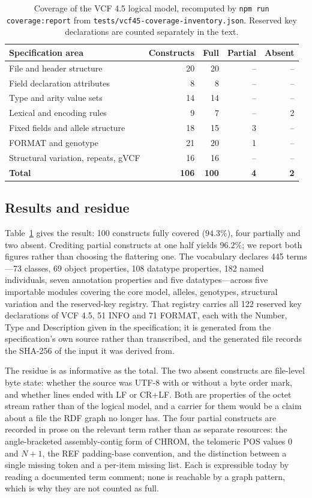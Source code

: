 \documentclass{ceurart}
\newcommand{\term}[1]{\texttt{#1}}
\begin{document}
\begin{table}[t]
\caption{Coverage of the VCF 4.5 logical model, recomputed by \term{npm run coverage:report} from \term{tests/vcf45-coverage-inventory.json}. Reserved key declarations are counted separately in the text.}
\label{tab:coverage}
\centering\small
\begin{tabularx}{\linewidth}{@{}Xrrrr@{}}
\hline
Specification area & Constructs & Full & Partial & Absent \\
\hline
File and header structure & 20 & 20 & -- & -- \\
Field declaration attributes & 8 & 8 & -- & -- \\
Type and arity value sets & 14 & 14 & -- & -- \\
Lexical and encoding rules & 9 & 7 & -- & 2 \\
Fixed fields and allele structure & 18 & 15 & 3 & -- \\
FORMAT and genotype & 21 & 20 & 1 & -- \\
Structural variation, repeats, gVCF & 16 & 16 & -- & -- \\
\hline
\textbf{Total} & \textbf{106} & \textbf{100} & \textbf{4} & \textbf{2} \\
\hline
\end{tabularx}
\end{table}

\subsection{Results and residue}

Table~\ref{tab:coverage} gives the result: 100 constructs fully covered ($94.3\%$), four partially and two absent. Crediting partial constructs at one half yields $96.2\%$; we report both figures rather than choosing the flattering one. The vocabulary declares 445 terms---73 classes, 69 object properties, 108 datatype properties, 182 named individuals, seven annotation properties and five datatypes---across five importable modules covering the core model, alleles, genotypes, structural variation and the reserved-key registry. That registry carries all 122 reserved key declarations of VCF 4.5, 51 INFO and 71 FORMAT, each with the Number, Type and Description given in the specification; it is generated from the specification's own source rather than transcribed, and the generated file records the SHA-256 of the input it was derived from.

The residue is as informative as the total. The two absent constructs are file-level byte state: whether the source was UTF-8 with or without a byte order mark, and whether lines ended with LF or CR+LF. Both are properties of the octet stream rather than of the logical model, and a carrier for them would be a claim about a file the RDF graph no longer has. The four partial constructs are recorded in prose on the relevant term rather than as separate resources: the angle-bracketed assembly-contig form of CHROM, the telomeric POS values 0 and $N+1$, the REF padding-base convention, and the distinction between a single missing token and a per-item missing list. Each is expressible today by reading a documented term comment; none is reachable by a graph pattern, which is why they are not counted as full.
\end{document}
